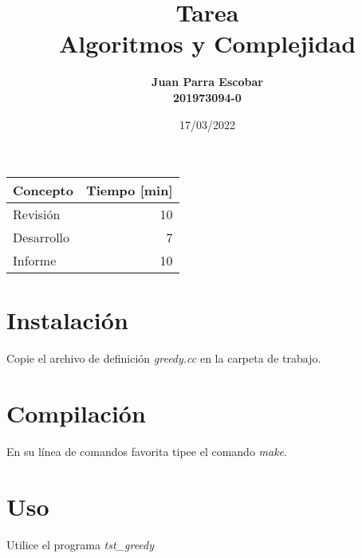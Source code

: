 \documentclass{article}
\title{Tarea \tnum\\
      Algoritmos y Complejidad\\[2ex]
      }
\author{
        \textbf{Juan Parra Escobar}\\
        \textbf{201973094-0}
}
\date{17/03/2022}
\begin{document}
\maketitle
\begin{center}
      \begin{tabular}{|l|r|}
        \hline
        \multicolumn{1}{|c|}{\textbf{Concepto}} &
          \multicolumn{1}{c|}{\textbf{Tiempo [min]}} \\
        \hline
        Revisión & 10\\
        \hline
        Desarrollo    & 7 \\
        \hline
        Informe       & 10 \\
        \hline
      \end{tabular}
    \end{center}
    

 
\section{Instalación}    

Copie el archivo de definición \emph{greedy.cc} en la carpeta de trabajo.

\section{Compilación}

En su línea de comandos favorita tipee el comando \emph{make}.

\section{Uso}

Utilice el programa \emph{tst_greedy}
\end{document}
